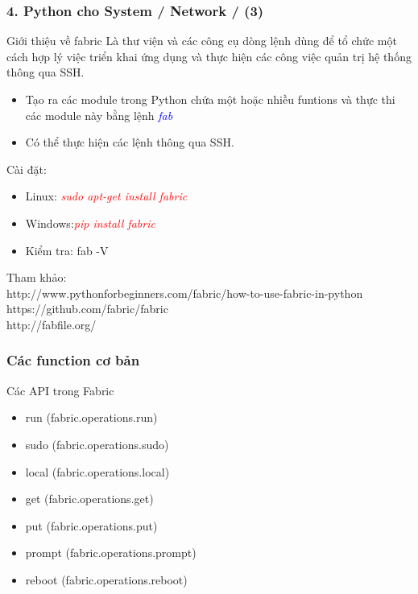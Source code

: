 \documentclass[10pt]{beamer}
\newcommand\sFontvi{\fontsize{8}{7.2}\selectfont} %
\begin{document}
\label{Slide xxx:Python cho Sysad - fabric}
\begin{frame}[fragile]\label{Gioi thieu fabric}
\frametitle{4. Python cho System / Network / (3) }
\begin{block}{Giới thiệu về fabric} 
Là thư viện và các công cụ dòng lệnh dùng để tổ chức một cách hợp lý việc triển khai ứng dụng và thực hiện các công việc quản trị hệ thống thông qua SSH. 	
\begin{itemize}
\item Tạo ra các module trong Python chứa một hoặc nhiều funtions và thực thi các module này bằng lệnh \textit{\textcolor{blue}{fab}}
\item Có thể thực hiện các lệnh thông qua SSH.
\end{itemize}
\end{block}
Cài đặt:
\pause
\begin{itemize}
\item Linux: \textit{\textcolor{red}{sudo apt-get install fabric}}
\pause
\item Windows:\textit{\textcolor{red}{pip install fabric}}
\item Kiểm tra: fab -V
\end{itemize}
Tham khảo:\\
http://www.pythonforbeginners.com/fabric/how-to-use-fabric-in-python\\
https://github.com/fabric/fabric\\
http://fabfile.org/
\end{frame}
\label{Cac chu y trong Python}
\begin{frame}[fragile]
\frametitle{Các function cơ bản}
\begin{block}{Các API trong Fabric}
\begin{itemize}
\item run (fabric.operations.run)
\item sudo (fabric.operations.sudo)
\item local (fabric.operations.local)
\item get (fabric.operations.get)
\item put (fabric.operations.put)
\item prompt (fabric.operations.prompt)
\item reboot (fabric.operations.reboot)
\end{itemize}
\end{block}
\end{frame}
\end{document}
